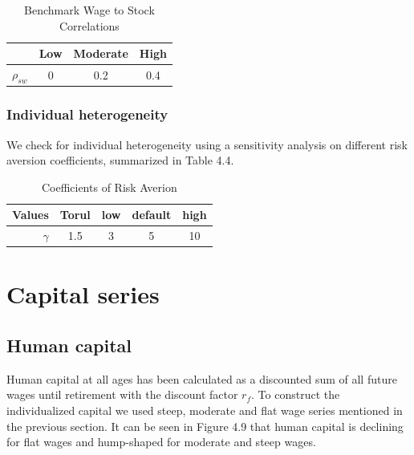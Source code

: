 \begin{table}
	\centering
	\caption{Benchmark Wage to Stock Correlations}
	\begin{tabular}[c]{c|ccc}
		&Low&Moderate&High\\
		\hline
		$\rho_{sw}$&0&0.2&0.4
	\end{tabular}
\end{table}


\subsubsection{Individual heterogeneity}




We check for individual heterogeneity using a sensitivity analysis on different risk aversion coefficients, summarized in Table 4.4.

\begin{table}
	\centering
	\caption{Coefficients of Risk Averion}
	\begin{tabular}[c]{r|cccc}
		Values&Torul&low&default&high\\
		\hline
		$\gamma$&1.5&3&5&10\\
	\end{tabular}
\end{table}

\section{Capital series}

\subsection{Human capital}
Human capital at all ages has been calculated as a discounted sum of all future wages until retirement with the discount factor $r_f$. To construct the individualized capital we used steep, moderate and flat wage series mentioned in the previous section. It can be seen in Figure 4.9 that human capital is declining for flat wages and hump-shaped for moderate and steep wages. 

